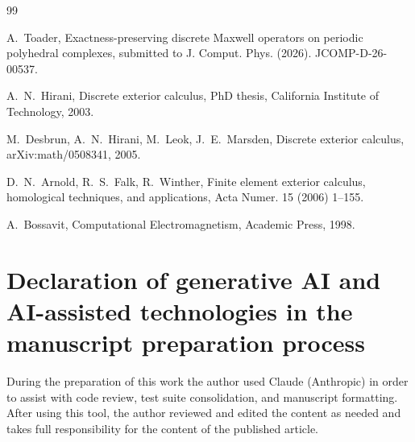 \documentclass[preprint,12pt]{elsarticle}
\begin{document}
\begin{thebibliography}{99}

A.~Toader,
\newblock Exactness-preserving discrete {M}axwell operators on periodic
  polyhedral complexes,
\newblock submitted to J. Comput. Phys. (2026).
\newblock JCOMP-D-26-00537.

A.~N.~Hirani,
\newblock Discrete exterior calculus,
\newblock PhD thesis, California Institute of Technology, 2003.

M.~Desbrun, A.~N.~Hirani, M.~Leok, J.~E.~Marsden,
\newblock Discrete exterior calculus,
\newblock arXiv:math/0508341, 2005.

D.~N.~Arnold, R.~S.~Falk, R.~Winther,
\newblock Finite element exterior calculus, homological techniques, and
  applications,
\newblock Acta Numer. 15 (2006) 1--155.

A.~Bossavit,
\newblock Computational Electromagnetism,
\newblock Academic Press, 1998.

\end{thebibliography}


\section*{Declaration of generative AI and AI-assisted technologies in the
manuscript preparation process}

During the preparation of this work the author used Claude (Anthropic)
in order to assist with code review, test suite consolidation, and manuscript
formatting. After using this tool, the author reviewed and edited the content
as needed and takes full responsibility for the content of the published
article.
\end{document}
